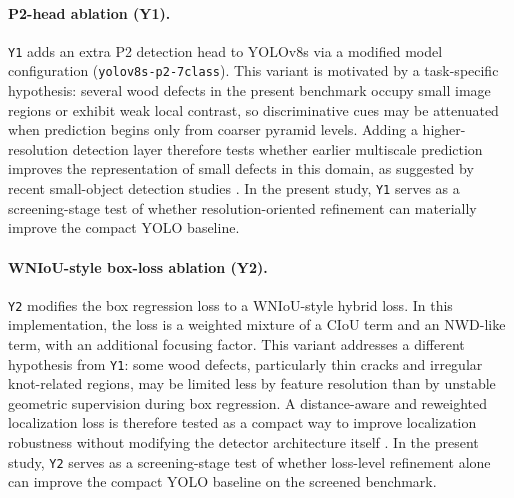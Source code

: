 \paragraph{P2-head ablation (Y1).}
\texttt{Y1} adds an extra P2 detection head to YOLOv8s via a modified model configuration (\texttt{yolov8s-p2-7class}). This variant is motivated by a task-specific hypothesis: several wood defects in the present benchmark occupy small image regions or exhibit weak local contrast, so discriminative cues may be attenuated when prediction begins only from coarser pyramid levels. Adding a higher-resolution detection layer therefore tests whether earlier multiscale prediction improves the representation of small defects in this domain, as suggested by recent small-object detection studies \citep{wei_2024_smallreview,hua_2025_smallsurvey,cmc_insulator_small}. In the present study, \texttt{Y1} serves as a screening-stage test of whether resolution-oriented refinement can materially improve the compact YOLO baseline.

\paragraph{WNIoU-style box-loss ablation (Y2).}
\texttt{Y2} modifies the box regression loss to a WNIoU-style hybrid loss. In this implementation, the loss is a weighted mixture of a CIoU term and an NWD-like term, with an additional focusing factor. This variant addresses a different hypothesis from \texttt{Y1}: some wood defects, particularly thin cracks and irregular knot-related regions, may be limited less by feature resolution than by unstable geometric supervision during box regression. A distance-aware and reweighted localization loss is therefore tested as a compact way to improve localization robustness without modifying the detector architecture itself \citep{wei_2024_smallreview,hua_2025_smallsurvey,cmc_msese}. In the present study, \texttt{Y2} serves as a screening-stage test of whether loss-level refinement alone can improve the compact YOLO baseline on the screened benchmark.

